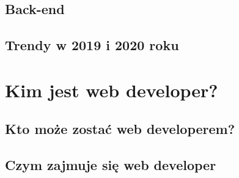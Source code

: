 \documentclass{report}
\begin{document}
	\section{Back-end}
	\newpage
	\section{Trendy w 2019 i 2020 roku}


	\newpage
	\chapter{Kim jest web developer?}
	\section{Kto może zostać web developerem?}
	\newpage
	\section{Czym zajmuje się web developer}

\tableofcontents
\end{document}
